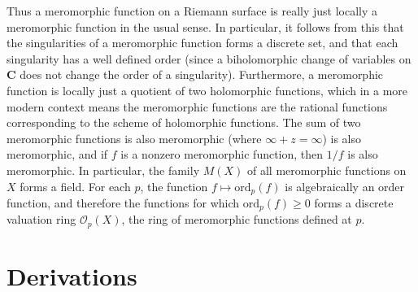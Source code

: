 Thus a meromorphic function on a Riemann surface is really just locally a meromorphic function in the usual sense. In particular, it follows from this that the singularities of a meromorphic function forms a discrete set, and that each singularity has a well defined order (since a biholomorphic change of variables on $\mathbf{C}$ does not change the order of a singularity). Furthermore, a meromorphic function is locally just a quotient of two holomorphic functions, which in a more modern context means the meromorphic functions are the rational functions corresponding to the scheme of holomorphic functions. The sum of two meromorphic functions is also meromorphic (where $\infty + z = \infty$) is also meromorphic, and if $f$ is a nonzero meromorphic function, then $1/f$ is also meromorphic. In particular, the family $M(X)$ of all meromorphic functions on $X$ forms a field. For each $p$, the function $f \mapsto \text{ord}_p(f)$ is algebraically an order function, and therefore the functions for which $\text{ord}_p(f) \geq 0$ forms a discrete valuation ring $\mathcal{O}_p(X)$, the ring of meromorphic functions defined at $p$.

\section{Derivations}

